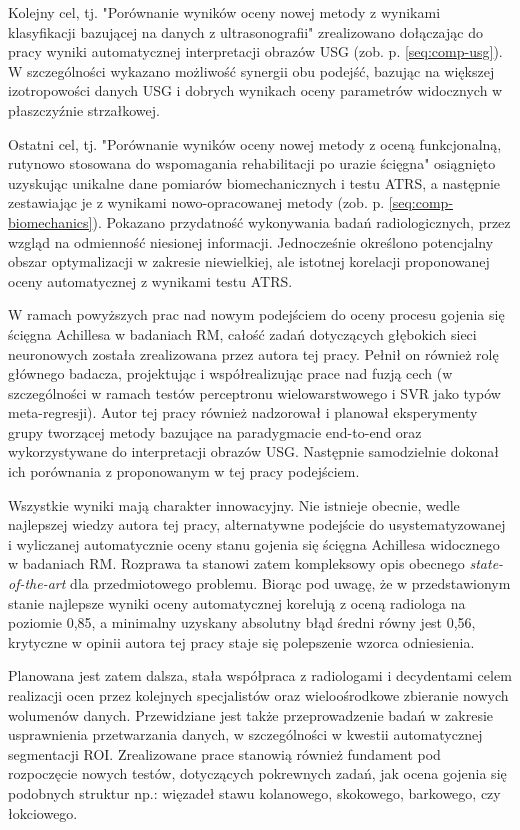 Kolejny cel, tj. "Porównanie wyników oceny nowej metody z wynikami klasyfikacji bazującej na danych z ultrasonografii" zrealizowano dołączając do pracy wyniki automatycznej interpretacji obrazów USG (zob. p. \ref{seq:comp-usg}). W szczególności wykazano możliwość synergii obu podejść, bazując na większej izotropowości danych USG i dobrych wynikach oceny parametrów widocznych w płaszczyźnie strzałkowej.

Ostatni cel, tj. "Porównanie wyników oceny nowej metody z oceną funkcjonalną, rutynowo stosowana do wspomagania rehabilitacji po urazie ścięgna" osiągnięto uzyskując unikalne dane pomiarów biomechanicznych i testu ATRS, a następnie zestawiając je z wynikami nowo-opracowanej metody (zob. p. \ref{seq:comp-biomechanics}). Pokazano przydatność wykonywania badań radiologicznych, przez wzgląd na odmienność niesionej informacji. Jednocześnie określono potencjalny obszar optymalizacji w zakresie niewielkiej, ale istotnej korelacji proponowanej oceny automatycznej z wynikami testu ATRS.  

W ramach powyższych prac nad nowym podejściem do oceny procesu gojenia się ścięgna Achillesa w badaniach RM, całość zadań dotyczących głębokich sieci neuronowych została zrealizowana przez autora tej pracy. Pełnił on również rolę głównego badacza, projektując i współrealizując prace nad fuzją cech (w szczególności w ramach testów perceptronu wielowarstwowego i SVR jako typów meta-regresji). Autor tej pracy również nadzorował i planował eksperymenty grupy tworzącej metody bazujące na paradygmacie end-to-end oraz wykorzystywane do interpretacji obrazów USG. Następnie samodzielnie dokonał ich porównania z proponowanym w tej pracy podejściem. 

Wszystkie wyniki mają charakter innowacyjny. Nie istnieje obecnie, wedle najlepszej wiedzy autora tej pracy, alternatywne podejście do usystematyzowanej i wyliczanej automatycznie oceny stanu gojenia się ścięgna Achillesa widocznego w badaniach RM. Rozprawa ta stanowi zatem kompleksowy opis obecnego \textit{state-of-the-art} dla przedmiotowego problemu. Biorąc pod uwagę, że w przedstawionym stanie najlepsze wyniki oceny automatycznej korelują z oceną radiologa na poziomie 0,85, a minimalny uzyskany absolutny błąd średni równy jest 0,56, krytyczne w opinii autora tej pracy staje się polepszenie wzorca odniesienia. 

Planowana jest zatem dalsza, stała współpraca z radiologami i decydentami celem realizacji ocen przez kolejnych specjalistów oraz wieloośrodkowe zbieranie nowych wolumenów danych. Przewidziane jest także przeprowadzenie badań w zakresie usprawnienia przetwarzania danych, w szczególności w kwestii automatycznej segmentacji ROI. Zrealizowane prace stanowią również fundament pod rozpoczęcie nowych testów, dotyczących pokrewnych zadań, jak ocena gojenia się podobnych struktur np.: więzadeł stawu kolanowego, skokowego, barkowego, czy łokciowego. 

